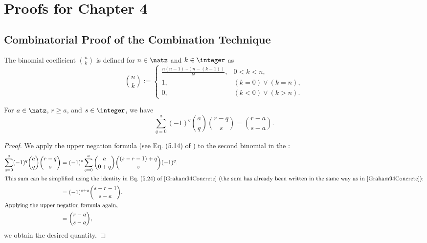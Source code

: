 \section{Proofs for Chapter 4}

\printornamentsfalse
\subsection{Combinatorial Proof of the Combination Technique}
\label{sec:proofCombiTechnique}
\printornamentstrue


\begin{definition}
  \label{def:binomialCoefficient}
  The binomial coefficient $\binom{n}{k}$ is defined for
  $n \in \natz$ and $k \in \integer$ as
  \begin{equation}
    \binom{n}{k}
    :=
    \begin{cases}
      \frac{n (n - 1) \dotsm (n - (k-1))}{k!},&0 < k < n,\\
      1,&(k = 0) \lor (k = n),\\
      0,&(k < 0) \lor (k > n).
    \end{cases}
  \end{equation}
\end{definition}

\begin{lemma}
  \label{lemma:inclusionExclusionCountingLemma}
  For $a \in \natz$, $r \ge a$, and $s \in \integer$, we have
  \begin{equation}
    \sum_{q=0}^a (-1)^q \binom{a}{q} \binom{r-q}{s}
    = \binom{r-a}{s-a}.
  \end{equation}
\end{lemma}

\begin{proof}
  We apply the upper negation formula
  (see Eq. (5.14) of \cite{Graham94Concrete})
  to the second binomial in the \lhs:
  \begin{subequations}
    \begin{align}
      \sum_{q=0}^a (-1)^q \binom{a}{q} \binom{r-q}{s}
      &= (-1)^s \sum_{q=0}^a \binom{a}{0+q} \binom{(s-r-1)+q}{s} (-1)^q.\\
      \intertext{%
        This sum can be simplified using the identity
        in Eq.\ (5.24) of \cite{Graham94Concrete}
        (the sum has already been written in the same way as in
        \cite{Graham94Concrete}):%
      }
      &= (-1)^{s+a} \binom{s-r-1}{s-a}.\\
      \intertext{%
        Applying the upper negation formula again,%
      }
      &= \binom{r-a}{s-a},
    \end{align}
  \end{subequations}
  we obtain the desired quantity.
\end{proof}


